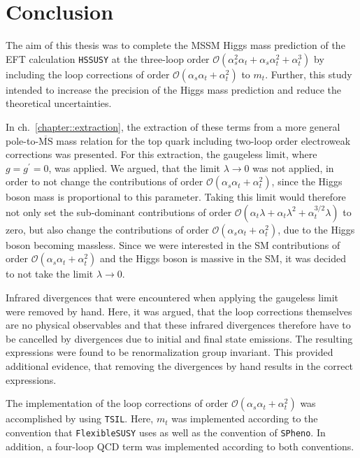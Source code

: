 \documentclass[a4paper,12pt]{book}
\begin{document}
\chapter{Conclusion}
\label{chapter::summary}
The aim of this thesis was to complete the MSSM Higgs mass prediction of the EFT calculation \texttt{HSSUSY} at the three-loop order $\mathcal{O}(\alpha_s^2\alpha_t+\alpha_s\alpha_t^2+\alpha_t^3)$ by including the loop corrections of order $\mathcal{O}(\alpha_s\alpha_t+\alpha_t^2)$ to $m_t$. Further, this study intended to increase the precision of the Higgs mass prediction and reduce the theoretical uncertainties.\par
In ch.\ \ref{chapter::extraction}, the extraction of these terms from a more general pole-to-$\overline{\text{MS}}$ mass relation for the top quark including two-loop order electroweak corrections was presented. For this extraction, the gaugeless limit, where $g=g^\prime=0$, was applied. We argued, that the limit $\lambda\rightarrow 0$ was not applied, in order to not change the contributions of order $\mathcal{O}(\alpha_s\alpha_t+\alpha_t^2)$, since the Higgs boson mass is proportional to this parameter. Taking this limit would therefore not only set the sub-dominant contributions of order $\mathcal{O}(\alpha_t\lambda+\alpha_t\lambda^2+\alpha_t^{3/2}\lambda)$ to zero, but also change the contributions of order $\mathcal{O}(\alpha_s\alpha_t+\alpha_t^2)$, due to the Higgs boson becoming massless. Since we were interested in the SM contributions of order $\mathcal{O}(\alpha_s\alpha_t+\alpha_t^2)$ and the Higgs boson is massive in the SM, it was decided to not take the limit $\lambda\rightarrow 0$.\par 
Infrared divergences that were encountered when applying the gaugeless limit were removed by hand. Here, it was argued, that the loop corrections themselves are no physical observables and that these infrared divergences therefore have to be cancelled by divergences due to initial and final state emissions. The resulting expressions were found to be renormalization group invariant. This provided additional evidence, that removing the divergences by hand results in the correct expressions.\par 
The implementation of the loop corrections of order $\mathcal{O}(\alpha_s\alpha_t+\alpha_t^2)$ was accomplished by using \texttt{TSIL}. Here, $m_t$ was implemented according to the convention that \texttt{FlexibleSUSY} uses as well as the convention of \texttt{SPheno}. In addition, a four-loop QCD term was implemented according to both conventions.\par
\end{document}
